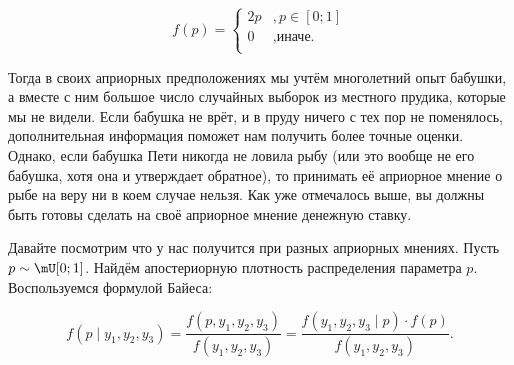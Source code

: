 \begin{figure}[H]
\begin{minipage}[H]{0.39\linewidth}
\begin{center}
\[ f(p) = \begin{cases}
            2p&, p \in [0;1] \\
             0&, \text{иначе.}\\
            \end{cases} \]
\end{center}
\end{minipage}
\hfill
\begin{minipage}[H]{0.59\linewidth}
\begin{center}
\end{center}
\end{minipage}
\end{figure}


Тогда в своих априорных предположениях мы учтём многолетний опыт бабушки, а вместе с ним большое число случайных выборок из местного прудика, которые мы не видели. Если бабушка не врёт, и в пруду ничего с тех пор не поменялось, дополнительная информация поможет нам получить более точные оценки. Однако, если бабушка Пети никогда не ловила рыбу (или это вообще не его бабушка, хотя она и утверждает обратное), то принимать её априорное мнение о рыбе на веру ни в коем случае нельзя. Как уже отмечалось выше, вы должны быть готовы сделать на своё априорное мнение денежную ставку. 

Давайте посмотрим что у нас получится при разных априорных мнениях. Пусть $p \sim \mU[0;1]$. Найдём апостериорную плотность распределения параметра $p$. Воспользуемся формулой Байеса:

\[ f(p \mid y_1,y_2,y_3) = \frac{f(p,y_1,y_2,y_3)}{f(y_1,y_2,y_3)} = \frac{f(y_1,y_2,y_3 \mid p) \cdot f(p)}{f(y_1,y_2,y_3)}.\]

